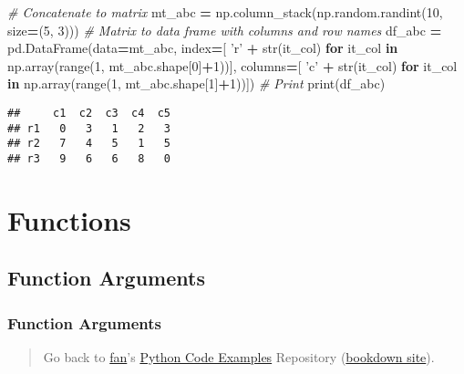 \documentclass[
]{book}
\newenvironment{Shaded}{\begin{snugshade}}{\end{snugshade}}
\newcommand{\BuiltInTok}[1]{#1}
\newcommand{\CommentTok}[1]{\textcolor[rgb]{0.56,0.35,0.01}{\textit{#1}}}
\newcommand{\ControlFlowTok}[1]{\textcolor[rgb]{0.13,0.29,0.53}{\textbf{#1}}}
\newcommand{\DecValTok}[1]{\textcolor[rgb]{0.00,0.00,0.81}{#1}}
\newcommand{\KeywordTok}[1]{\textcolor[rgb]{0.13,0.29,0.53}{\textbf{#1}}}
\newcommand{\NormalTok}[1]{#1}
\newcommand{\OperatorTok}[1]{\textcolor[rgb]{0.81,0.36,0.00}{\textbf{#1}}}
\newcommand{\StringTok}[1]{\textcolor[rgb]{0.31,0.60,0.02}{#1}}
\begin{document}
\begin{Shaded}
\begin{Highlighting}[]
\CommentTok{# Concatenate to matrix}
\NormalTok{mt_abc }\OperatorTok{=}\NormalTok{ np.column_stack(np.random.randint(}\DecValTok{10}\NormalTok{, size}\OperatorTok{=}\NormalTok{(}\DecValTok{5}\NormalTok{, }\DecValTok{3}\NormalTok{)))}
\CommentTok{# Matrix to data frame with columns and row names}
\NormalTok{df_abc }\OperatorTok{=}\NormalTok{ pd.DataFrame(data}\OperatorTok{=}\NormalTok{mt_abc,}
\NormalTok{            index}\OperatorTok{=}\NormalTok{[ }\StringTok{'r'} \OperatorTok{+} \BuiltInTok{str}\NormalTok{(it_col) }\ControlFlowTok{for}\NormalTok{ it_col }\KeywordTok{in}\NormalTok{ np.array(}\BuiltInTok{range}\NormalTok{(}\DecValTok{1}\NormalTok{, mt_abc.shape[}\DecValTok{0}\NormalTok{]}\OperatorTok{+}\DecValTok{1}\NormalTok{))],}
\NormalTok{            columns}\OperatorTok{=}\NormalTok{[ }\StringTok{'c'} \OperatorTok{+} \BuiltInTok{str}\NormalTok{(it_col) }\ControlFlowTok{for}\NormalTok{ it_col }\KeywordTok{in}\NormalTok{ np.array(}\BuiltInTok{range}\NormalTok{(}\DecValTok{1}\NormalTok{, mt_abc.shape[}\DecValTok{1}\NormalTok{]}\OperatorTok{+}\DecValTok{1}\NormalTok{))])}
\CommentTok{# Print}
\BuiltInTok{print}\NormalTok{(df_abc)}
\end{Highlighting}
\end{Shaded}

\begin{verbatim}
##     c1  c2  c3  c4  c5
## r1   0   3   1   2   3
## r2   7   4   5   1   5
## r3   9   6   6   8   0
\end{verbatim}

\hypertarget{functions}{%
\chapter{Functions}\label{functions}}

\hypertarget{function-arguments}{%
\section{Function Arguments}\label{function-arguments}}

\hypertarget{function-arguments-1}{%
\subsection{Function Arguments}\label{function-arguments-1}}

\begin{quote}
Go back to \href{http://fanwangecon.github.io/}{fan}'s \href{https://fanwangecon.github.io/pyfan/}{Python Code Examples} Repository (\href{https://fanwangecon.github.io/pyfan/bookdown}{bookdown site}).
\end{quote}
\end{document}
